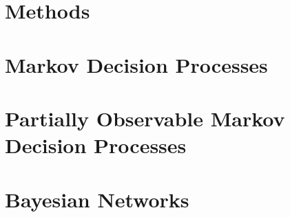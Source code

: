 
\section{Methods} %

\label{appendix-methods} %



\section{Markov Decision Processes}

\section{Partially Observable Markov Decision Processes}

\section{Bayesian Networks}


